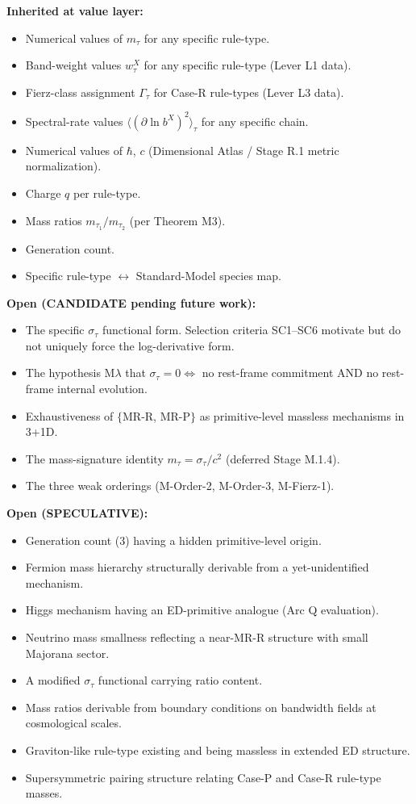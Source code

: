 \documentclass[11pt,a4paper]{article}
\begin{document}
\textbf{Inherited at value layer:}

\begin{itemize}[noitemsep]
  \item Numerical values of $m_\tau$ for any specific rule-type.
  \item Band-weight values $w_\tau^X$ for any specific rule-type (Lever L1 data).
  \item Fierz-class assignment $\Gamma_\tau$ for Case-R rule-types (Lever L3 data).
  \item Spectral-rate values $\langle(\partial\ln b^X)^2\rangle_\tau$ for any specific chain.
  \item Numerical values of $\hbar$, $c$ (Dimensional Atlas / Stage R.1 metric normalization).
  \item Charge $q$ per rule-type.
  \item Mass ratios $m_{\tau_1}/m_{\tau_2}$ (per Theorem M3).
  \item Generation count.
  \item Specific rule-type $\leftrightarrow$ Standard-Model species map.
\end{itemize}

\textbf{Open (CANDIDATE pending future work):}

\begin{itemize}[noitemsep]
  \item The specific $\sigma_\tau$ functional form. Selection criteria SC1--SC6 motivate but do not uniquely force the log-derivative form.
  \item The hypothesis M$\lambda$ that $\sigma_\tau = 0 \iff$ no rest-frame commitment AND no rest-frame internal evolution.
  \item Exhaustiveness of $\{$MR-R, MR-P$\}$ as primitive-level massless mechanisms in 3+1D.
  \item The mass-signature identity $m_\tau = \sigma_\tau/c^2$ (deferred Stage M.1.4).
  \item The three weak orderings (M-Order-2, M-Order-3, M-Fierz-1).
\end{itemize}

\textbf{Open (SPECULATIVE):}

\begin{itemize}[noitemsep]
  \item Generation count (3) having a hidden primitive-level origin.
  \item Fermion mass hierarchy structurally derivable from a yet-unidentified mechanism.
  \item Higgs mechanism having an ED-primitive analogue (Arc Q evaluation).
  \item Neutrino mass smallness reflecting a near-MR-R structure with small Majorana sector.
  \item A modified $\sigma_\tau$ functional carrying ratio content.
  \item Mass ratios derivable from boundary conditions on bandwidth fields at cosmological scales.
  \item Graviton-like rule-type existing and being massless in extended ED structure.
  \item Supersymmetric pairing structure relating Case-P and Case-R rule-type masses.
\end{itemize}
\end{document}
